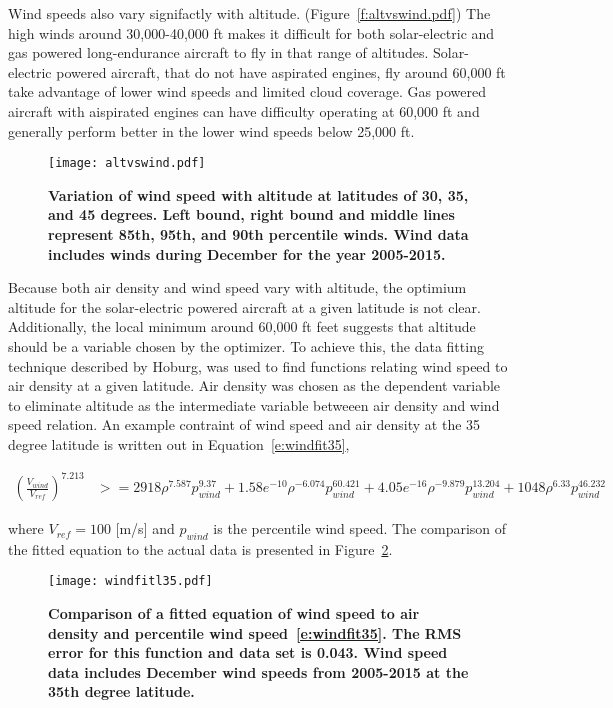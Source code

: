 \documentclass[]{aiaa-tc}%
\begin{document}
Wind speeds also vary signifactly with altitude. (Figure~\ref{f:altvswind.pdf})
The high winds around 30,000-40,000 ft makes it difficult for both solar-electric and gas powered long-endurance aircraft to fly in that range of altitudes.  
Solar-electric powered aircraft, that do not have aspirated engines, fly around 60,000 ft take advantage of lower wind speeds and limited cloud coverage.
Gas powered aircraft with aispirated engines can have difficulty operating at 60,000 ft and generally perform better in the lower wind speeds below 25,000 ft.

\begin{figure}[H]
	\begin{center}
	\texttt{[image: altvswind.pdf]}
    \caption{ \textbf{ Variation of wind speed with altitude at latitudes of 30, 35, and 45 degrees.  Left bound, right bound and middle lines represent 85th, 95th, and 90th percentile winds. Wind data includes winds during December for the year 2005-2015.}}
	\label{f:altvswind}
	\end{center}
\end{figure}

Because both air density and wind speed vary with altitude, the optimium altitude for the solar-electric powered aircraft at a given latitude is not clear. 
Additionally, the local minimum around 60,000 ft feet suggests that altitude should be a variable chosen by the optimizer. 
To achieve this, the data fitting technique described by Hoburg\cite{fitting}, was used to find functions relating wind speed to air density at a given latitude.  
Air density was chosen as the dependent variable to eliminate altitude as the intermediate variable betweeen air density and wind speed relation. 
An example contraint of wind speed and air density at the 35 degree latitude is written out in Equation~\ref{e:windfit35},


\begin{align}
    \label{e:windfit35}
    \left(\frac{V_{wind}}{V_{ref}}\right)^{7.213} &>= 2918\rho^{7.587}p_{wind}^{9.37} + 1.58e^{-10}\rho^{-6.074}p_{wind}^{60.421} + 4.05e^{-16}\rho^{-9.879}p_{wind}^{13.204} + 1048\rho^{6.33}p_{wind}^{46.232}
\end{align}

where $V_{ref} = 100$ [m/s] and $p_{wind}$ is the percentile wind speed. The comparison of the fitted equation to the actual data is presented in Figure~\ref{f:windfitl35}. 

\begin{figure}[H]
	\begin{center}
	\texttt{[image: windfitl35.pdf]}
    \caption{ \textbf{ Comparison of a fitted equation of wind speed to air density and percentile wind speed~\eqref{e:windfit35}. The RMS error for this function and data set is 0.043. Wind speed data includes December wind speeds from 2005-2015 at the 35th degree latitude. }}
	\label{f:windfitl35}
	\end{center}
\end{figure}
\end{document}
